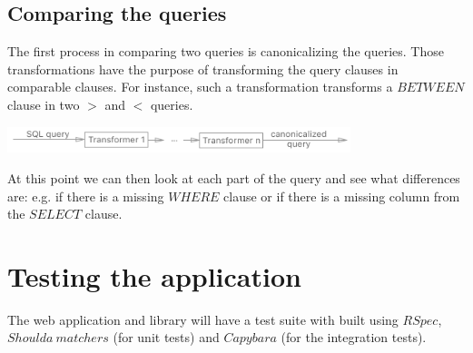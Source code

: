 \subsection{Comparing the queries} \label{design:comparing_the_queries}
The first process in comparing two queries is canonicalizing the queries.
Those transformations have the purpose of transforming the query clauses in
comparable clauses. For instance, such a transformation transforms a
$BETWEEN$ clause in two $>$ and $<$ queries.
\begin{center}
    \includegraphics[width=100mm]{images/design/transforming_process.png}
\end{center}
At this point we can then look at each part of the query and see what differences
are: e.g. if there is a missing $WHERE$ clause or if there is a missing column
from the $SELECT$ clause.

\section{Testing the application}
The web application and library will have a test suite with built using $RSpec$, $Shoulda\ matchers$
(for unit tests) and $Capybara$ (for the integration tests).
